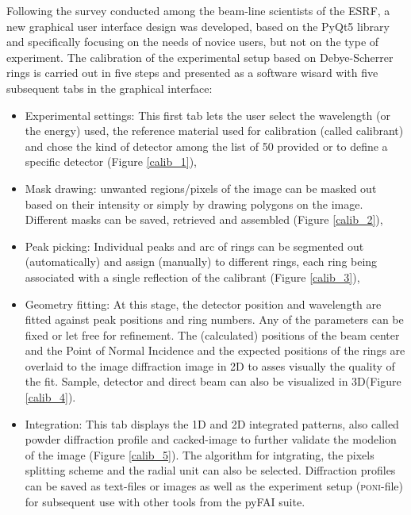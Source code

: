 \documentclass[preprint]{iucr}              %
\begin{document}
Following the survey conducted among the beam-line scientists of the ESRF, a
new graphical user interface design was developed, based on the PyQt5
library \cite{pyqt} and specifically focusing on the needs of novice users, but
not on the type of experiment.
The calibration of the experimental setup based on Debye-Scherrer rings 
is carried out in five steps and presented as a software wisard with five
subsequent tabs in the graphical interface:
\begin{itemize}
  \item{Experimental settings:} This first tab lets the user select
  the wavelength (or the energy) used, the reference material used
  for calibration (called calibrant) and chose the kind of detector among the
  list of 50 provided or to define a specific detector (Figure \ref{calib_1}),
  \item{Mask drawing:} unwanted regions/pixels of the
  image can be masked out based on their intensity or simply by
  drawing polygons on the image. Different masks can be saved,
  retrieved and assembled (Figure \ref{calib_2}),
  \item{Peak picking:} Individual peaks and arc of rings can be segmented out
  (automatically) and assign (manually) to different rings, each ring 
  being associated with a single reflection of the calibrant (Figure
  \ref{calib_3}),
  \item{Geometry fitting:} At this stage, the detector position and
  wavelength are fitted against peak positions and ring numbers. 
  Any of the  parameters can be fixed or let free for refinement.
  The (calculated) positions of the beam center and the Point of Normal
  Incidence and the expected positions of the rings are overlaid to the image
  diffraction image in 2D to asses visually the quality of the fit. Sample, detector 
  and direct beam can also be visualized in 3D(Figure \ref{calib_4}). 
  \item{Integration:} This tab displays the  1D and 2D integrated patterns, also
  called powder diffraction profile and cacked-image to further validate the
  modelion of the image (Figure \ref{calib_5}). 
  The algorithm for intgrating, the pixels splitting scheme and the radial unit
  can also be selected. 
  Diffraction profiles can be saved as text-files or images as well as the
  experiment setup (\textsc{poni}-file) for subsequent use with other tools from
  the pyFAI suite.
\end{itemize}
\end{document}
